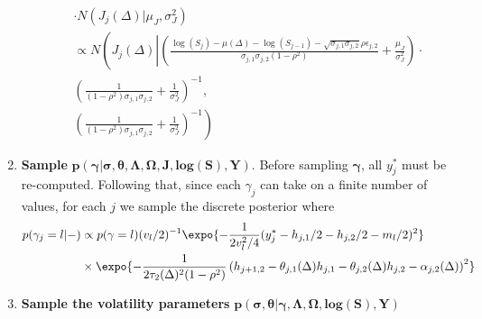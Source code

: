 \begin{enumerate}
\begin{enumerate}
\begin{multline*}
      \cdot N(J_j(\Delta) | \mu_J, \sigma_J^2) \\
      \propto N\left(J_j(\Delta) \left | \left(\frac{\log(S_j) - \mu(\Delta) - \log(S_{j-1}) - \sqrt{\sigma_{j,1}\sigma_{j,2}}\rho\epsilon_{j,2}}{\sigma_{j,1}\sigma_{j,2}(1-\rho^2)} + \frac{\mu_J}{\sigma^2_J}\right) \cdot \right. \right.\\ %
      \left( \frac{1}{(1-\rho^2)\sigma_{j,1}\sigma_{j,2} } + \frac{1}{\sigma_J^2}   \right)^{-1}, \\
      \left. \left( \frac{1}{(1-\rho^2)\sigma_{j,1}\sigma_{j,2} } + \frac{1}{\sigma_J^2}   \right)^{-1} \right)
    \end{multline*}
  \end{enumerate}

\item \textbf{Sample} $\boldsymbol{p(\gamma | \sigma, \theta, \Lambda, \Omega, J, \mbox{log}(S), Y)}.$ Before sampling $\boldsymbol{\gamma}$, all $y^{*}_j$ must be re-computed. Following that, since each $\gamma_j$ can take on a finite number of values, for each $j$ we sample the discrete posterior where
\begin{align*}
  p(\gamma_j = l | - ) &\propto p(\gamma = l) (v_{l} / 2)^{-1} \expo{ -\frac{1}{2 v^2_{l}/4 } ( y^*_j - h_{j,1}/2 - h_{j,2}/2 - m_{l}/2 )^2 } \\
  & \times \expo{ -\frac{1}{2 \tau_2(\Delta)^2 (1-\rho^2) } \left( h_{j+1,2} - \theta_{j,1}(\Delta) h_{j,1} - \theta_{j,2}(\Delta) h_{j,2} - \alpha_{j,2}(\Delta)  \right)^2 }
\end{align*}

\item \textbf{Sample the volatility parameters} $\boldsymbol{p(\sigma, \theta | \gamma, \Lambda, \Omega, \mbox{log}(S), Y)}$


\end{enumerate}
